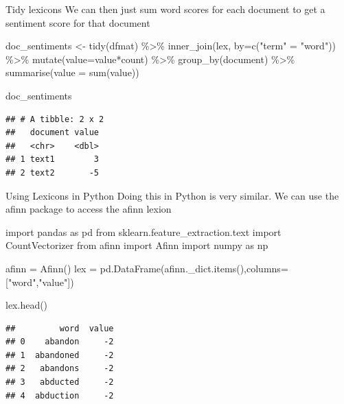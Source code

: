\documentclass[
  10pt,
  ignorenonframetext,
  aspectratio=169]{beamer}
\newenvironment{Shaded}{\begin{snugshade}}{\end{snugshade}}
\newcommand{\AttributeTok}[1]{\textcolor[rgb]{0.80,0.80,0.80}{#1}}
\newcommand{\FunctionTok}[1]{\textcolor[rgb]{0.94,0.94,0.56}{#1}}
\newcommand{\ImportTok}[1]{\textcolor[rgb]{0.80,0.80,0.80}{#1}}
\newcommand{\NormalTok}[1]{\textcolor[rgb]{0.80,0.80,0.80}{#1}}
\newcommand{\OperatorTok}[1]{\textcolor[rgb]{0.94,0.94,0.82}{#1}}
\newcommand{\OtherTok}[1]{\textcolor[rgb]{0.94,0.94,0.56}{#1}}
\newcommand{\SpecialCharTok}[1]{\textcolor[rgb]{0.86,0.64,0.64}{#1}}
\newcommand{\StringTok}[1]{\textcolor[rgb]{0.80,0.58,0.58}{#1}}
\begin{document}
\begin{frame}[fragile]{Tidy lexicons}
\protect\hypertarget{tidy-lexicons-1}{}
We can then just sum word scores for each document to get a sentiment
score for that document

\medskip
\scriptsize

\begin{Shaded}
\begin{Highlighting}[]
\NormalTok{doc\_sentiments }\OtherTok{\textless{}{-}} \FunctionTok{tidy}\NormalTok{(dfmat) }\SpecialCharTok{\%\textgreater{}\%} 
  \FunctionTok{inner\_join}\NormalTok{(lex, }\AttributeTok{by=}\FunctionTok{c}\NormalTok{(}\StringTok{"term"} \OtherTok{=} \StringTok{"word"}\NormalTok{)) }\SpecialCharTok{\%\textgreater{}\%}
  \FunctionTok{mutate}\NormalTok{(}\AttributeTok{value=}\NormalTok{value}\SpecialCharTok{*}\NormalTok{count) }\SpecialCharTok{\%\textgreater{}\%}
  \FunctionTok{group\_by}\NormalTok{(document) }\SpecialCharTok{\%\textgreater{}\%}
  \FunctionTok{summarise}\NormalTok{(}\AttributeTok{value =} \FunctionTok{sum}\NormalTok{(value))}

\NormalTok{doc\_sentiments}
\end{Highlighting}
\end{Shaded}

\begin{verbatim}
## # A tibble: 2 x 2
##   document value
##   <chr>    <dbl>
## 1 text1        3
## 2 text2       -5
\end{verbatim}
\end{frame}

\begin{frame}[fragile]{Using Lexicons in Python}
\protect\hypertarget{using-lexicons-in-python}{}
Doing this in Python is very similar. We can use the afinn package to
access the afinn lexion

\medskip
\scriptsize

\begin{Shaded}
\begin{Highlighting}[]
\ImportTok{import}\NormalTok{ pandas }\ImportTok{as}\NormalTok{ pd}
\ImportTok{from}\NormalTok{ sklearn.feature\_extraction.text }\ImportTok{import}\NormalTok{ CountVectorizer}
\ImportTok{from}\NormalTok{ afinn }\ImportTok{import}\NormalTok{ Afinn}
\ImportTok{import}\NormalTok{ numpy }\ImportTok{as}\NormalTok{ np}

\NormalTok{afinn }\OperatorTok{=}\NormalTok{ Afinn()}
\NormalTok{lex }\OperatorTok{=}\NormalTok{ pd.DataFrame(afinn.\_dict.items(),columns}\OperatorTok{=}\NormalTok{[}\StringTok{"word"}\NormalTok{,}\StringTok{"value"}\NormalTok{])}

\NormalTok{lex.head()}
\end{Highlighting}
\end{Shaded}

\begin{verbatim}
##         word  value
## 0    abandon     -2
## 1  abandoned     -2
## 2   abandons     -2
## 3   abducted     -2
## 4  abduction     -2
\end{verbatim}
\end{frame}
\end{document}
